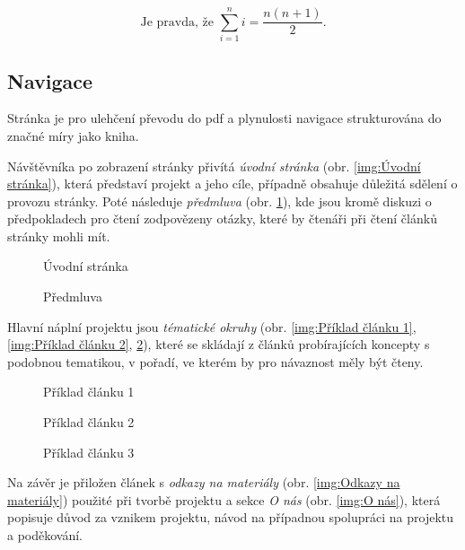 \documentclass[a4paper, 12pt]{article}
\begin{document}
  \begin{equation} \label{eq:converted equation}
    \text{Je pravda, že }\sum_{i=1}^{n} i = \frac{n(n+1)}{2}\text{.}
  \end{equation}


  \subsection{Navigace}
  Stránka je pro ulehčení převodu do \gls{pdf} a plynulosti navigace strukturována do značné míry jako kniha.

  Návštěvníka po zobrazení stránky přivítá \emph{úvodní stránka} (obr. \ref{img:Úvodní stránka}), která představí projekt a jeho cíle, případně obsahuje důležitá sdělení o provozu stránky. Poté následuje \emph{předmluva} (obr. \ref{img:Předmluva}), kde jsou kromě diskuzi o předpokladech pro čtení zodpovězeny otázky, které by čtenáři při čtení článků stránky mohli mít.

  \begin{figure}[H]
      \caption{Úvodní stránka} \label{img:Úvodní stránka}
    \endminipage\hfill
      \caption{Předmluva} \label{img:Předmluva}
    \endminipage
  \end{figure}

  Hlavní náplní projektu jsou \emph{tématické okruhy} (obr. \ref{img:Příklad článku 1}, \ref{img:Příklad článku 2}, \ref{img:Příklad článku 3}), které se skládají z článků probírajících koncepty s podobnou tematikou, v pořadí, ve kterém by pro návaznost měly být čteny.

  \begin{figure}[H]
      \caption{Příklad článku 1} \label{img:Příklad článku 1}
    \endminipage\hfill
      \caption{Příklad článku 2} \label{img:Příklad článku 2}
    \endminipage\hfill
      \caption{Příklad článku 3} \label{img:Příklad článku 3}
    \endminipage
  \end{figure}

  Na závěr je přiložen článek s \emph{odkazy na materiály} (obr. \ref{img:Odkazy na materiály}) použité při tvorbě projektu a sekce \emph{O nás} (obr. \ref{img:O nás}), která popisuje důvod za vznikem projektu, návod na případnou spolupráci na projektu a poděkování.
\end{document}
